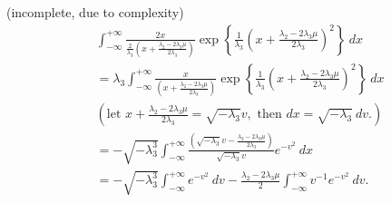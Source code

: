 \begin{answer}{(incomplete, due to complexity)}
	\begin{align}
		&\int_{-\infty}^{+\infty} \frac{2x}{\frac{2}{\lambda_3} \left( x + \frac{\lambda_2 - 2\lambda_3\mu}{2\lambda_3} \right)}\exp\left\{ \frac{1}{\lambda_3} \left( x + \frac{\lambda_2 - 2\lambda_3\mu}{2\lambda_3} \right)^2  \right\}\ dx\\
		&= \lambda_3 \int_{-\infty}^{+\infty} \frac{x}{ \left( x + \frac{\lambda_2 - 2\lambda_3\mu}{2\lambda_3} \right)}\exp\left\{ \frac{1}{\lambda_3} \left( x + \frac{\lambda_2 - 2\lambda_3\mu}{2\lambda_3} \right)^2  \right\}\ dx\\
		&\left(\mbox{let }  x + \frac{\lambda_2 - 2\lambda_3\mu}{2\lambda_3} = \sqrt{-\lambda_3}v, \mbox{ then } dx = \sqrt{-\lambda_3}\ dv. \right) \nonumber\\
		&= -\sqrt{-\lambda_3^3} \int_{-\infty}^{+\infty} \frac{\left( \sqrt{-\lambda_3}v - \frac{\lambda_2 - 2\lambda_3\mu}{2\lambda_3} \right)}{\sqrt{-\lambda_3}v}e^{-v^2}\ dx\\
		&= -\sqrt{-\lambda_3^3} \int_{-\infty}^{+\infty} e^{-v^2}\ dv - \frac{\lambda_2 - 2\lambda_3\mu}{2}\int_{-\infty}^{+\infty} v^{-1}e^{-v^2}\ dv.
	\end{align}
\end{answer}